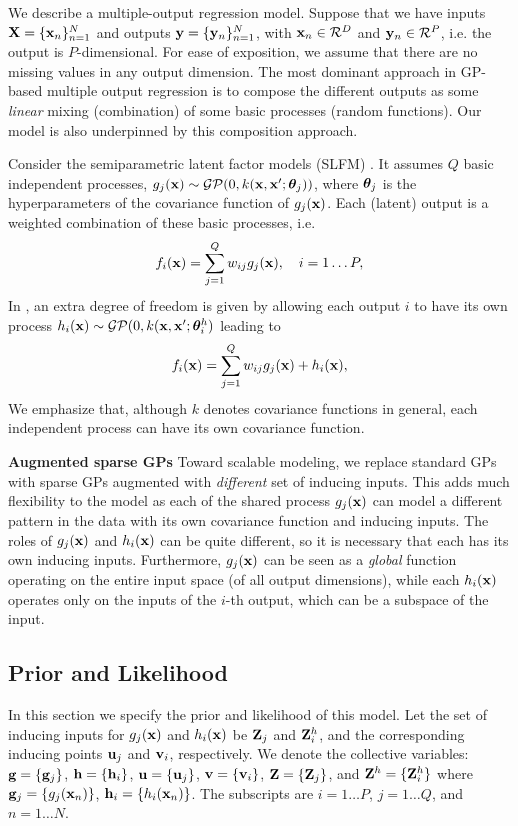 We describe a multiple-output regression model.
Suppose that we have inputs $\mathbf{X} = \{\mathbf{x}_n\}_{n=1}^N$ and outputs $\mathbf{y} = \{\mathbf{y}_n\}_{n=1}^N$, with $\mathbf{x}_n \in \mathcal{R}^D$ and $\mathbf{y}_n \in \mathcal{R}^P$, i.e. the output is $P$-dimensional.
For ease of exposition, we assume that there are no missing values in any output dimension.
The most dominant approach in GP-based multiple output regression is to compose the different outputs as some \textit{linear} mixing (combination) of some basic processes (random functions).
Our model is also underpinned by this composition approach.

\noindent Consider the semiparametric latent factor models (SLFM) \citet{teh-et-al-aistats-05}.
It assumes $Q$ basic independent processes, $g_j(\mathbf{x}) \sim \mathcal{GP}(0, k(\mathbf{x},\mathbf{x}';\boldsymbol{ \theta }_j))$, where $\boldsymbol{ \theta }_j$ is the hyperparameters of the covariance function of $g_j(\mathbf{x})$.
Each (latent) output is a weighted combination of these basic processes, i.e.
\begin{align}
f_i(\mathbf{x}) = \sum_{j=1}^Q w_{ij} g_j(\mathbf{x}), \quad i = 1 \hdots P,
\end{align}
In \citet{seeger2005semiparametric}, an extra degree of freedom is given by allowing each output $i$ to have its own process $h_i(\mathbf{x}) \sim \mathcal{GP}(0, k(\mathbf{x},\mathbf{x}'; \boldsymbol{ \theta }^h_i)$ leading to
\begin{align}
f_i(\mathbf{x}) = \sum_{j=1}^Q w_{ij} g_j(\mathbf{x}) + h_i(\mathbf{x}), 
\end{align}
We emphasize that, although $k$ denotes covariance functions in general, each independent process can have its own covariance function.

\noindent 
\textbf{Augmented sparse GPs}
Toward scalable modeling, we replace standard GPs with sparse GPs augmented with \textit{different} set of inducing inputs.
This adds much flexibility to the model as each of the shared process $g_j(\mathbf{x})$ can model a different pattern in the data with its own covariance function and inducing inputs. The roles of $g_j(\mathbf{x})$ and $h_i(\mathbf{x})$ can be quite different, so it is necessary that each has its own inducing inputs.
Furthermore, $g_j(\mathbf{x})$ can be seen as a \textit{global} function operating on the entire input space (of all output dimensions), while each $h_i(\mathbf{x})$ operates only on the inputs of the $i$-th output, which can be a subspace of the input.


\subsection{Prior and Likelihood}
In this section we specify the prior and likelihood of this model. 
\newcommand{\Zj}{\Z_j}
\newcommand{\Zhi}{\Z^h_i}
Let the set of inducing inputs for $g_j(\mathbf{x})$ and $h_i(\mathbf{x})$ be $\mathbf{Z}_j$ and $\mathbf{Z}^h_i$, and the corresponding inducing points $\mathbf{u}_j$ and $\mathbf{v}_i$, respectively.
We denote the collective variables: $\mathbf{g} = \{\mathbf{g}_j\}$, $\mathbf{h} = \{\mathbf{h}_i \}$, $\mathbf{u} = \{\mathbf{u}_j\}$, $\mathbf{v} = \{\mathbf{v}_i\}$, $\Z = \{\Zj\}$, and $\Z^h = \{\Zhi \}$ where $\mathbf{g}_j = \{g_j(\mathbf{x}_n)\}$, $\mathbf{h}_i = \{h_i(\mathbf{x}_n)\}$. 
The subscripts are $i = 1 \hdots P$, $j = 1 \hdots Q$, and $n = 1 \hdots N$.

